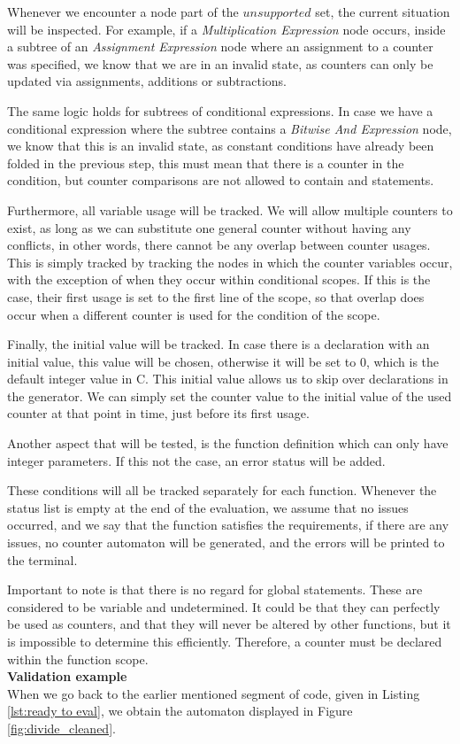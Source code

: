 \documentclass[12pt]{thesis}
\begin{document}
Whenever we encounter a node part of the $unsupported$ set, the current situation will be inspected. For example, if a \textit{Multiplication Expression} node occurs, inside a subtree of an \textit{Assignment Expression} node where an assignment to a counter was specified, we know that we are in an invalid state, as counters can only be updated via assignments, additions or subtractions. 

The same logic holds for subtrees of conditional expressions. In case we have a conditional expression where the subtree contains a \textit{Bitwise And Expression} node, we know that this is an invalid state, as constant conditions have already been folded in the previous step, this must mean that there is a counter in the condition, but counter comparisons are not allowed to contain and statements.

Furthermore, all variable usage will be tracked. We will allow multiple counters to exist, as long as we can substitute one general counter without having any conflicts, in other words, there cannot be any overlap between counter usages. This is simply tracked by tracking the nodes in which the counter variables occur, with the exception of when they occur within conditional scopes. If this is the case, their first usage is set to the first line of the scope, so that overlap does occur when a different counter is used for the condition of the scope. 

Finally, the initial value will be tracked. In case there is a declaration with an initial value, this value will be chosen, otherwise it will be set to 0, which is the default integer value in C. This initial value allows us to skip over declarations in the generator. We can simply set the counter value to the initial value of the used counter at that point in time, just before its first usage.

Another aspect that will be tested, is the function definition which can only have integer parameters. If this not the case, an error status will be added.

These conditions will all be tracked separately for each function. Whenever the status list is empty at the end of the evaluation, we assume that no issues occurred, and we say that the function satisfies the requirements, if there are any issues, no counter automaton will be generated, and the errors will be printed to the terminal.

Important to note is that there is no regard for global statements. These are considered to be variable and undetermined. It could be that they can perfectly be used as counters, and that they will never be altered by other functions, but it is impossible to determine this efficiently. Therefore, a counter must be declared within the function scope.\\
\newpage
\noindent
\textbf{Validation example}\\
When we go back to the earlier mentioned segment of code, given in Listing \ref{lst:ready to eval}, we obtain the automaton displayed in Figure \ref{fig:divide_cleaned}.
\end{document}
